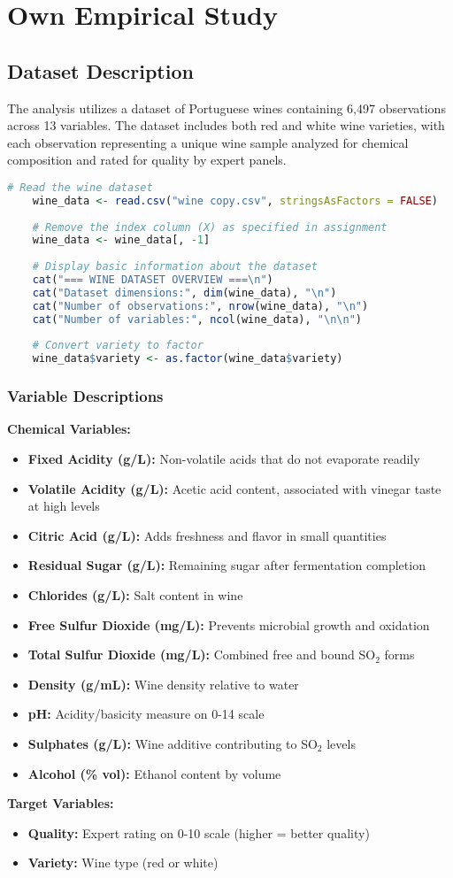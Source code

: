 \chapter{Own Empirical Study}

\section{Dataset Description}

The analysis utilizes a dataset of Portuguese wines containing 6,497 observations across 13 variables. The dataset includes both red and white wine varieties, with each observation representing a unique wine sample analyzed for chemical composition and rated for quality by expert panels.

\begin{lstlisting}[language=R, caption=Data Import and Initial Setup, breaklines=true]
	# Read the wine dataset
	wine_data <- read.csv("wine copy.csv", stringsAsFactors = FALSE)
	
	# Remove the index column (X) as specified in assignment
	wine_data <- wine_data[, -1]
	
	# Display basic information about the dataset
	cat("=== WINE DATASET OVERVIEW ===\n")
	cat("Dataset dimensions:", dim(wine_data), "\n")
	cat("Number of observations:", nrow(wine_data), "\n")
	cat("Number of variables:", ncol(wine_data), "\n\n")
	
	# Convert variety to factor
	wine_data$variety <- as.factor(wine_data$variety)
\end{lstlisting}

\subsection{Variable Descriptions}

\textbf{Chemical Variables:}
\begin{itemize}
	\item \textbf{Fixed Acidity (g/L):} Non-volatile acids that do not evaporate readily
	\item \textbf{Volatile Acidity (g/L):} Acetic acid content, associated with vinegar taste at high levels
	\item \textbf{Citric Acid (g/L):} Adds freshness and flavor in small quantities
	\item \textbf{Residual Sugar (g/L):} Remaining sugar after fermentation completion
	\item \textbf{Chlorides (g/L):} Salt content in wine
	\item \textbf{Free Sulfur Dioxide (mg/L):} Prevents microbial growth and oxidation
	\item \textbf{Total Sulfur Dioxide (mg/L):} Combined free and bound SO$_2$ forms
	\item \textbf{Density (g/mL):} Wine density relative to water
	\item \textbf{pH:} Acidity/basicity measure on 0-14 scale
	\item \textbf{Sulphates (g/L):} Wine additive contributing to SO$_2$ levels
	\item \textbf{Alcohol (\% vol):} Ethanol content by volume
\end{itemize}

\textbf{Target Variables:}
\begin{itemize}
	\item \textbf{Quality:} Expert rating on 0-10 scale (higher = better quality)
	\item \textbf{Variety:} Wine type (red or white)
\end{itemize}